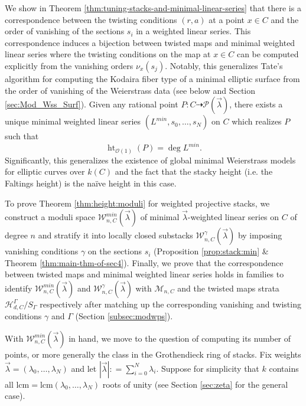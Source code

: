 \documentclass[a4paper,12pt]{amsart}
\theoremstyle{definition}
\newcommand{\cO}{\mathcal{O}}
\newcommand{\cW}{\mathcal{W}}
\newcommand{\cH}{\mathcal{H}}
\newcommand{\cM}{\mathcal{M}}
\DeclareMathOperator{\height}{ht}
\newcommand{\Pcv}{\mathcal{P}(\vec{\lambda})}
\newcommand{\lambdavec}{{\vec{\lambda}}}
\begin{document}
	We show in Theorem \ref{thm:tuning-stacks-and-minimal-linear-series} that there is a correspondence between the twisting conditions $(r,a)$ at a point $x \in C$ and the order of vanishing of the sections $s_i$ in a weighted linear series. This correspondence induces a bijection between twisted maps and minimal weighted linear series where the twisting conditions on the map at $x \in C$ can be computed explicitly from the vanishing orders $\nu_x(s_j)$. Notably, this generalizes Tate's algorithm for computing the Kodaira fiber type of a minimal elliptic surface from the order of vanishing of the Weierstrass data (see below and Section \ref{sec:Mod_Wss_Surf}). Given any rational point $P : C \dashrightarrow \Pcv$, there exists a unique minimal weighted linear series $(L^{min}, s_0, \ldots, s_N)$ on $C$ which realizes $P$ such that
	$$
	\height_{\cO(1)}(P) = \deg L^{min}. 
	$$
	Significantly, this generalizes the existence of global minimal Weierstrass models for elliptic curves over $k(C)$ and the fact that the stacky height (i.e. the Faltings height) is the na\"ive height in this case. 
	
	To prove Theorem \ref{thm:height:moduli} for weighted projective stacks, we construct a moduli space $\cW_{n,C}^{min}(\lambdavec)$ of minimal $\lambdavec$-weighted linear series on $C$ of degree $n$ and stratify it into locally closed substacks $\cW_{n,C}^\gamma(\lambdavec)$ by imposing vanishing conditions $\gamma$ on the sections $s_i$ (Proposition \ref{prop:stack:min} \& Theorem \ref{thm:main-thm-of-sec4}). Finally, we prove that the correspondence between twisted maps and minimal weighted linear series holds in families to identify $\cW_{n,C}^{min}(\lambdavec)$ and $\cW_{n,C}^\gamma(\lambdavec)$ with $\cM_{n,C}$ and the twisted maps strata $\cH^\Gamma_{d,C}/S_\Gamma$ respectively after matching up the corresponding vanishing and twisting conditions $\gamma$ and $\Gamma$ (Section \ref{subsec:modwps}).
	
	\medskip
	
	
	
	With $\cW_{n,C}^{min}(\lambdavec)$ in hand, we move to the question of computing its number of points, or more generally the class in the Grothendieck ring of stacks. Fix weights $\lambdavec = (\lambda_0, \ldots, \lambda_N)$ and let $|\lambdavec| \colon = \sum_{i = 0}^N \lambda_i$. Suppose for simplicity that $k$ contains all $\mathrm{lcm} = \mathrm{lcm}(\lambda_0, \ldots, \lambda_N)$ roots of unity (see Section \ref{sec:zeta} for the general case). 
	
\end{document}
